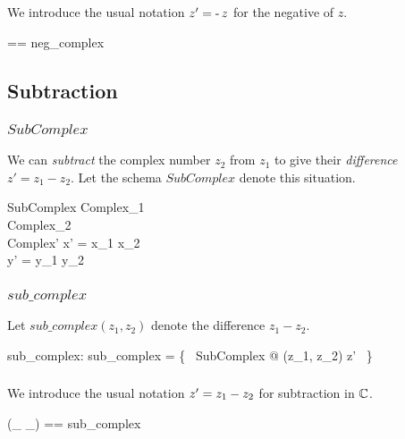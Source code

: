 \documentclass{amsart}
\begin{document}
\subsubsection{}

We introduce the usual notation $z' = \operatorname{-} z$ for the negative of $z$.
\begin{zed}
	\negC == neg\_complex
\end{zed}

\subsection{Subtraction}

\subsubsection{$SubComplex$}

We can \textit{subtract} the complex number $z_2$ from $z_1$
to give their \textit{difference} $z' = z_1 - z_2$.
Let the schema $SubComplex$ denote this situation.

\begin{schema}{SubComplex}
	Complex_1 \\
	Complex_2 \\
	Complex'
\where
	x' = x_1 \subR x_2 \\
	y' = y_1 \subR y_2
\end{schema}

\subsubsection{$sub\_complex$}

Let $sub\_complex(z_1, z_2)$ denote the difference $z_1 - z_2$.

\begin{axdef}
	sub\_complex: \C \cross \C \fun \C
\where
	sub\_complex = \{~ SubComplex @ (z_1, z_2) \mapsto z' ~\}
\end{axdef}

\subsubsection{}

We introduce the usual notation $z' = z_1 \mathbin{-} z_2$ for subtraction in $\mathbb{C}$.

\begin{zed}
	(\_ \subC \_) == sub\_complex
\end{zed}
\end{document}
